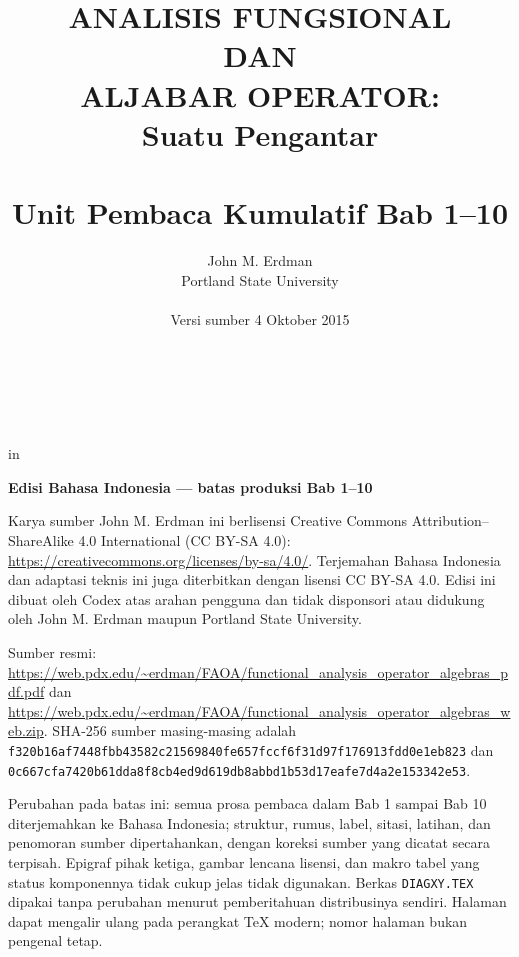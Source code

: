 \documentclass[11pt,reqno]{amsbook}
\theoremstyle{definition}
\theoremstyle{remark}
\numberwithin{equation}{section}
\begin{document}
 \frontmatter
 \title{ANALISIS FUNGSIONAL \\ DAN \\ ALJABAR OPERATOR: \\ Suatu Pengantar \\ \mbox{} \\ \large Unit Pembaca Kumulatif Bab 1--10}
 \author{John M. Erdman \\
      Portland State University \\
      \mbox{\hphantom{P}} \\
      Versi sumber 4 Oktober 2015 \\
      \mbox{\hphantom{P}} \\
      \mbox{\hphantom{P}} \\
            \mbox{\hphantom{P}} \\
                  \mbox{\hphantom{P}} }


 in


\maketitle


\begin{center}
\textbf{Edisi Bahasa Indonesia --- batas produksi Bab 1--10}
\end{center}

Karya sumber John M. Erdman ini berlisensi Creative Commons
Attribution--ShareAlike 4.0 International (CC BY-SA 4.0):
\url{https://creativecommons.org/licenses/by-sa/4.0/}.
Terjemahan Bahasa Indonesia dan adaptasi teknis ini juga diterbitkan dengan
lisensi CC BY-SA 4.0. Edisi ini dibuat oleh Codex atas arahan pengguna dan tidak
disponsori atau didukung oleh John M. Erdman maupun Portland State University.

\begin{sloppypar}
Sumber resmi:
\url{https://web.pdx.edu/~erdman/FAOA/functional_analysis_operator_algebras_pdf.pdf}
dan
\url{https://web.pdx.edu/~erdman/FAOA/functional_analysis_operator_algebras_web.zip}.
SHA-256 sumber masing-masing adalah
\texttt{f320b16af7448fbb43582c21569840fe\allowbreak657fccf6f31d97f176913fdd0e1eb823}
dan
\texttt{0c667cfa7420b61dda8f8cb4ed9d619d\allowbreak b8abbd1b53d17eafe7d4a2e153342e53}.
\end{sloppypar}

Perubahan pada batas ini: semua prosa pembaca dalam Bab 1 sampai Bab 10
diterjemahkan ke Bahasa Indonesia; struktur, rumus, label, sitasi, latihan,
dan penomoran sumber dipertahankan, dengan koreksi sumber yang dicatat secara
terpisah. Epigraf pihak ketiga, gambar lencana lisensi, dan makro tabel yang
status komponennya tidak cukup jelas tidak digunakan. Berkas
\texttt{DIAGXY.TEX} dipakai tanpa perubahan menurut pemberitahuan distribusinya
sendiri. Halaman dapat
mengalir ulang pada perangkat TeX modern; nomor halaman bukan pengenal tetap.
\end{document}
